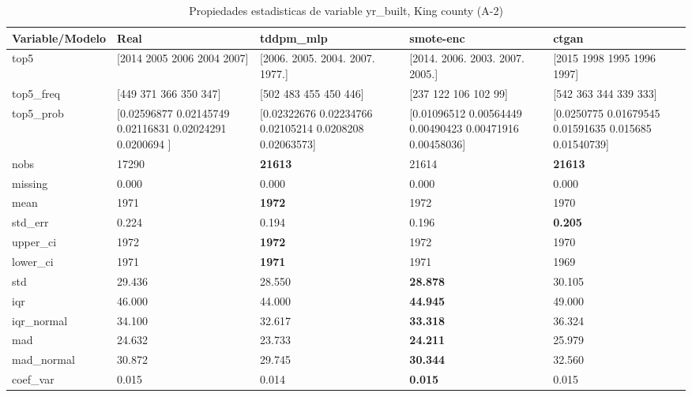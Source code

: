 \begin{table}[H]
\centering
\fontsize{8}{14}\selectfont
\caption{Propiedades  estadisticas de variable yr\_built, King county (A-2)}
\label{table-stats-king county-a-2-yr_built}
\begin{tabular}{|l|m{10em}|m{10em}|m{10em}|m{10em}|}
\hline
 \rowcolor[gray]{0.8}
Variable/Modelo & Real & tddpm\_mlp & smote-enc & ctgan \\
\hline top5 & [2014 2005 2006 2004 2007] & [2006. 2005. 2004. 2007. 1977.] & [2014. 2006. 2003. 2007. 2005.] & [2015 1998 1995 1996 1997] \\
\hline top5\_freq & [449 371 366 350 347] & [502 483 455 450 446] & [237 122 106 102  99] & [542 363 344 339 333] \\
\hline top5\_prob & [0.02596877 0.02145749 0.02116831 0.02024291 0.0200694 ] & [0.02322676 0.02234766 0.02105214 0.0208208  0.02063573] & [0.01096512 0.00564449 0.00490423 0.00471916 0.00458036] & [0.0250775  0.01679545 0.01591635 0.015685   0.01540739] \\
\hline nobs & 17290 & \bfseries 21613 & \cellcolor[rgb]{0.9, 0.54, 0.52} 21614 & \bfseries 21613 \\
\hline missing & 0.000 & 0.000 & 0.000 & 0.000 \\
\hline mean & 1971 & \bfseries 1972 & 1972 & \cellcolor[rgb]{0.9, 0.54, 0.52} 1970 \\
\hline std\_err & 0.224 & \cellcolor[rgb]{0.9, 0.54, 0.52} 0.194 & 0.196 & \bfseries 0.205 \\
\hline upper\_ci & 1972 & \bfseries 1972 & 1972 & \cellcolor[rgb]{0.9, 0.54, 0.52} 1970 \\
\hline lower\_ci & 1971 & \bfseries 1971 & 1971 & \cellcolor[rgb]{0.9, 0.54, 0.52} 1969 \\
\hline std & 29.436 & \cellcolor[rgb]{0.9, 0.54, 0.52} 28.550 & \bfseries 28.878 & 30.105 \\
\hline iqr & 46.000 & 44.000 & \bfseries 44.945 & \cellcolor[rgb]{0.9, 0.54, 0.52} 49.000 \\
\hline iqr\_normal & 34.100 & 32.617 & \bfseries 33.318 & \cellcolor[rgb]{0.9, 0.54, 0.52} 36.324 \\
\hline mad & 24.632 & 23.733 & \bfseries 24.211 & \cellcolor[rgb]{0.9, 0.54, 0.52} 25.979 \\
\hline mad\_normal & 30.872 & 29.745 & \bfseries 30.344 & \cellcolor[rgb]{0.9, 0.54, 0.52} 32.560 \\
\hline coef\_var & 0.015 & \cellcolor[rgb]{0.9, 0.54, 0.52} 0.014 & \bfseries 0.015 & 0.015 \\

\end{tabular}
\end{table}
